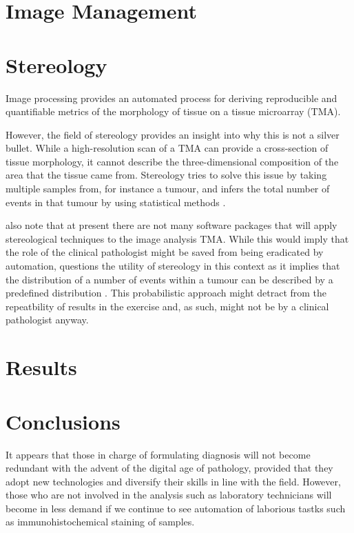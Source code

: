 \documentclass[12pt]{article}
\begin{document}
\section{Image Management}

\section{Stereology}
Image processing provides an automated process for deriving reproducible and quantifiable metrics of the 
morphology of tissue on a tissue microarray (TMA).

However, the field of stereology provides an insight into why this is not a silver bullet. While a high-resolution 
scan of a TMA can provide a cross-section of tissue morphology, it cannot describe the three-dimensional 
composition of the area that the tissue came from. Stereology tries to solve this issue by taking multiple samples 
from, for instance a tumour, and infers the total number of events in that tumour by using statistical methods 
\parencite{webster2014whole}.

\citeauthor{webster2014whole} also note that at present there are not many software packages that will apply 
stereological techniques to the image analysis TMA. While this would imply that the role of the clinical pathologist 
might be saved from being eradicated by automation, \citeauthor{suvarna2013bancroft} questions the utility of 
stereology in this context as it implies that the distribution of a number of events within a tumour can be described 
by a predefined distribution \parencite[p.~540, Ch.~23.]{suvarna2013bancroft}. This probabilistic approach might 
detract from the repeatbility of results in the exercise and, as such, might not be by a clinical pathologist anyway.

\section{Results}\label{results}

\section{Conclusions}\label{conclusions}

It appears that those in charge of formulating diagnosis will not become redundant with the advent of the digital age 
of pathology, provided that they adopt new technologies and diversify their skills in line with the field. However, those 
who are not involved in the analysis such as laboratory technicians will become in less demand if we continue to see 
automation of laborious tastks such as immunohistochemical staining of samples.

\printbibliography
\end{document}
